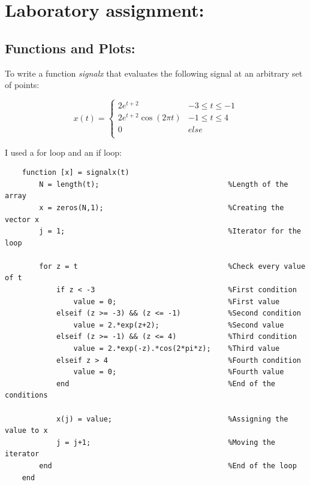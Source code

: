\documentclass[a4paper,11pt]{article}
\begin{document}
\section{Laboratory assignment:}

\subsection{Functions and Plots:}

To write a function \textit{signalx} that evaluates the following signal at an arbitrary set of points:

\bigskip

\begin{equation}\label{eq:ex1}
    x(t) = 
    \begin{cases} 
      2e^{t+2} & -3 \leq t \leq -1 \\
      2e^{t+2}\cos(2\pi t) & -1 \leq t \leq 4 \\
      0 & else\\
    \end{cases}
\end{equation}

\bigskip

I used a for loop and an if loop:

\bigskip

\begin{lstlisting}
    function [x] = signalx(t)
        N = length(t);                              %Length of the array
        x = zeros(N,1);                             %Creating the vector x
        j = 1;                                      %Iterator for the loop    
        
        for z = t                                   %Check every value of t
            if z < -3                               %First condition
                value = 0;                          %First value
            elseif (z >= -3) && (z <= -1)           %Second condition
                value = 2.*exp(z+2);                %Second value
            elseif (z >= -1) && (z <= 4)            %Third condition
                value = 2.*exp(-z).*cos(2*pi*z);    %Third value
            elseif z > 4                            %Fourth condition
                value = 0;                          %Fourth value
            end                                     %End of the conditions
        
            x(j) = value;                           %Assigning the value to x
            j = j+1;                                %Moving the iterator
        end                                         %End of the loop
    end
\end{lstlisting}
\end{document}
